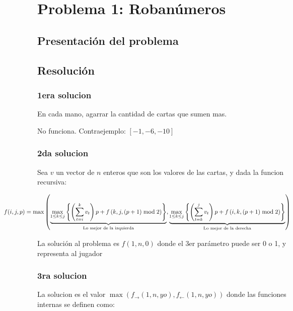 \section{Problema 1: Roban\'umeros}

\subsection{Presentaci\'on del problema}

\subsection{Resoluci\'on}

\subsubsection{1era solucion}
En cada mano, agarrar la cantidad de cartas que sumen mas. 

No funciona. Contraejemplo: $[-1, -6, -10]$
  
\subsubsection{2da solucion}

Sea $v$ un vector de $n$ enteros que son los valores de las cartas, y dada la funcion recursiva: 

\begin{equation*}\hspace*{-2cm}
 f(i,j,p) = \max \left( 
  \underbrace{ \max_{1\leq k \leq j}{ \left\{ \left( \sum_{t=i}^k v_t \right) p + f\left(k,j, (p+1)\bmod{2} \right) \right\} } }_{ \text{Lo mejor de la izquierda} },
  \underbrace{ \max_{1\leq k \leq j}{ \left\{ \left( \sum_{t=k}^j v_t \right) p + f\left(i,k, (p+1)\bmod{2} \right) \right\} } }_{ \text{Lo mejor de la derecha} }
 \right) 
\end{equation*}

La soluci\'on al problema es $f(1,n,0)$ donde el 3er par\'ametro puede ser 0 o 1, y representa al jugador


\subsubsection{3ra solucion}

La solucion es el valor $\max (f_{\rightarrow}(1,n,yo), f_{\leftarrow}(1,n,yo))$ donde las funciones internas se definen como: 

